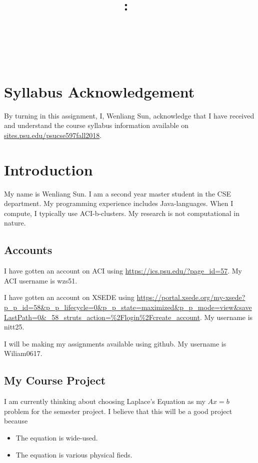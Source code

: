 \documentclass{article}
\title{\vspace{2in}\textmd{\textbf{\hmwkClass:\ \hmwkTitle}}\\\normalsize\vspace{0.1in}\small{\hmwkDueDate}\\\vspace{0.1in}\large{\textit{\hmwkClassInstructor\ \hmwkClassTime}}\vspace{3in}}
\date{}
\author{\textbf{\hmwkAuthorNameb} } %
\begin{document}
\begin{spacing}{1.1}
\maketitle

\newpage
\section{Syllabus Acknowledgement}

By turning in this assignment, I, Wenliang Sun, acknowledge that I have received and understand the course syllabus information available on \url{sites.psu.edu/psucse597fall2018}. 

\section{Introduction}

My name is Wenliang Sun.  I am a second year master student in the CSE department. My programming experience includes Java-languages.  When I compute, I typically use ACI-b-clusters.  My research is not computational in nature. 


\subsection{Accounts}

I have gotten an account on ACI using \url{https://ics.psu.edu/?page_id=57}.  My ACI username is wzs51.

I have gotten an account on XSEDE using \url{https://portal.xsede.org/my-xsede?p_p_id=58&p_p_lifecycle=0&p_p_state=maximized&p_p_mode=view&saveLastPath=0&_58_struts_action=%2Flogin%2Fcreate_account}.  My username is nitt25.

I will be making my assignments available using github. My username is Wiliam0617. 

\subsection{My Course Project}

I am currently thinking about choosing Laplace’s Equation as my $Ax=b$ problem for the semester project. I believe that this will be a good project because
\begin{itemize}
  \item The equation is wide-used.
  \item The equation is various physical fieds.
\end{itemize}



\end{spacing}
\end{document}
